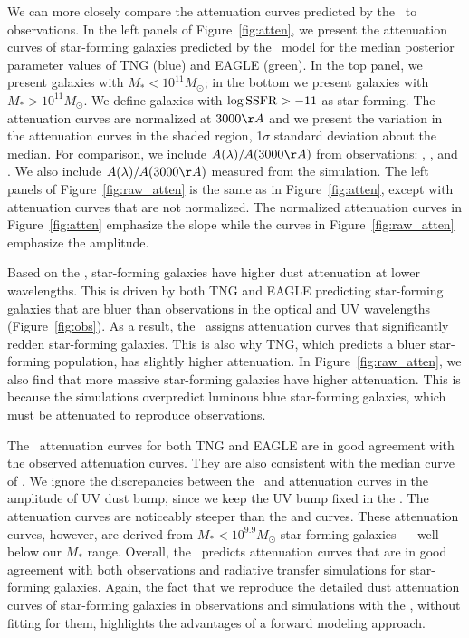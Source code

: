 We can more closely compare the attenuation curves predicted by the \eda~to 
observations. In the left panels of Figure~\ref{fig:atten}, we present the 
attenuation curves of star-forming galaxies predicted by the \eda~model for 
the median posterior parameter values of TNG (blue) and EAGLE (green). In 
the top panel, we present galaxies with $M_* < 10^{11} M_\odot$; in 
the bottom we present galaxies with $M_* > 10^{11} M_\odot$. We define
galaxies with $\log {\rm SSFR} > -11$ as star-forming. The attenuation curves 
are normalized at
$3000\AA$ and we present the variation in the attenuation curves in the shaded
region, 1$\sigma$ standard deviation about the median. For comparison,
we include $A(\lambda)/A(3000\AA)$ from observations: \cite{calzetti2000},
\cite{battisti2017}, and \cite{salim2018}. We also include $A(\lambda)/A(3000\AA)$
measured from the \cite{narayanan2018} simulation. The left panels of
Figure~\ref{fig:raw_atten} is the same as in Figure~\ref{fig:atten}, except
with attenuation curves that are not normalized. The normalized attenuation
curves in Figure~\ref{fig:atten} emphasize the slope while the curves in
Figure~\ref{fig:raw_atten} emphasize the amplitude. 

Based on the \eda, star-forming galaxies have higher dust attenuation at lower
wavelengths. This is driven by both TNG and EAGLE predicting star-forming
galaxies that are bluer than observations in the optical and UV wavelengths
(Figure~\ref{fig:obs}). As a result, the \eda~assigns attenuation curves that
significantly redden star-forming galaxies. This is also why TNG, which
predicts a bluer star-forming population, has slightly higher attenuation. 
In Figure~\ref{fig:raw_atten}, we also find that more massive star-forming
galaxies have higher attenuation. This is because the simulations overpredict 
luminous blue star-forming galaxies, which must be attenuated to reproduce
observations. 

The \eda~attenuation curves for both TNG and EAGLE are in good agreement with the
observed \cite{salim2018} attenuation curves. They are also consistent with the
median curve of \cite{narayanan2018}. We ignore the discrepancies between the
\eda~and \cite{narayanan2018} attenuation curves in the amplitude of UV dust
bump, since we keep the UV bump fixed in the \eda. The \eda attenuation curves 
are noticeably steeper than the \cite{calzetti2000} and \cite{battisti2017} curves. 
These attenuation curves, however, are derived from $M_* < 10^{9.9}M_\odot$ 
star-forming galaxies --- well below our $M_*$ range. %
Overall, the \eda~predicts attenuation curves that are in good agreement with 
both observations and radiative transfer simulations for star-forming galaxies. 
Again, the fact that we reproduce the detailed dust attenuation curves of star-forming 
galaxies in observations and simulations with the \eda, without fitting for
them, highlights the advantages of a forward modeling approach. 

